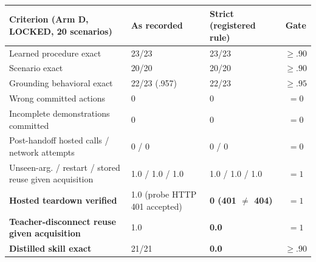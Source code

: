 \begin{tabular}{lllc}
\toprule
Criterion (Arm D, LOCKED, 20 scenarios) & As recorded & Strict (registered rule) & Gate\\
\midrule
Learned procedure exact & 23/23 & 23/23 & $\ge .90$\\
Scenario exact & 20/20 & 20/20 & $\ge .90$\\
Grounding behavioral exact & 22/23 (.957) & 22/23 & $\ge .95$\\
Wrong committed actions & 0 & 0 & $=0$\\
Incomplete demonstrations committed & 0 & 0 & $=0$\\
Post-handoff hosted calls / network attempts & 0 / 0 & 0 / 0 & $=0$\\
Unseen-arg. / restart / stored reuse given acquisition & 1.0 / 1.0 / 1.0 & 1.0 / 1.0 / 1.0 & $=1$\\
\textbf{Hosted teardown verified} & 1.0 (probe HTTP 401 accepted) & \textbf{0 (401 $\ne$ 404)} & $=1$\\
\textbf{Teacher-disconnect reuse given acquisition} & 1.0 & \textbf{0.0} & $=1$\\
\textbf{Distilled skill exact} & 21/21 & \textbf{0.0} & $\ge .90$\\
\bottomrule
\end{tabular}
